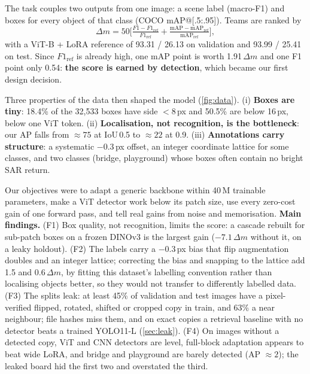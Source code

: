 \documentclass[10pt,twocolumn,letterpaper]{article}
\newcommand{\dm}{\ensuremath{\Delta m}}
\begin{document}
The task couples two outputs from one image: a scene label (macro-F1) and boxes for every object of that class (COCO mAP@[.5:.95]). Teams are ranked by
\begin{equation}
\dm = 50\Big[\tfrac{F1-F1_\text{ref}}{F1_\text{ref}} + \tfrac{\text{mAP}-\text{mAP}_\text{ref}}{\text{mAP}_\text{ref}}\Big],
\end{equation}
with a ViT-B + LoRA reference of 93.31 / 26.13 on validation and 93.99 / 25.41 on test. Since $F1_\text{ref}$ is already high, one mAP point is worth 1.91\,\dm{} and one F1 point only 0.54: \textbf{the score is earned by detection}, which became our first design decision.

Three properties of the data then shaped the model (\cref{fig:data}). (i) \textbf{Boxes are tiny}: 18.4\% of the 32{,}533 boxes have side $<8$\,px and 50.5\% are below 16\,px, \ie below one ViT token. (ii) \textbf{Localisation, not recognition, is the bottleneck}: our AP falls from ${\approx}75$ at IoU\,0.5 to ${\approx}22$ at 0.9. (iii) \textbf{Annotations carry structure}: a systematic $-0.3$\,px offset, an integer coordinate lattice for some classes, and two classes (bridge, playground) whose boxes often contain no bright SAR return.

Our objectives were to adapt a generic backbone within 40\,M trainable parameters, make a ViT detector work below its patch size, use every zero-cost gain of one forward pass, and tell real gains from noise and memorisation. \textbf{Main findings.} (F1) Box quality, not recognition, limits the score: a cascade rebuilt for sub-patch boxes on a frozen DINOv3 is the largest gain ($-7.1$\,\dm{} without it, on a leaky holdout). (F2) The labels carry a $-0.3$\,px bias that flip augmentation doubles and an integer lattice; correcting the bias and snapping to the lattice add 1.5 and 0.6\,\dm, by fitting this dataset's labelling convention rather than localising objects better, so they would not transfer to differently labelled data. (F3) The splits leak: at least 45\% of validation and test images have a pixel-verified flipped, rotated, shifted or cropped copy in train, and 63\% a near neighbour; file hashes miss them, and on exact copies a retrieval baseline with no detector beats a trained YOLO11-L (\cref{sec:leak}). (F4) On images without a detected copy, ViT and CNN detectors are level, full-block adaptation appears to beat wide LoRA, and bridge and playground are barely detected (AP ${\approx}2$); the leaked board hid the first two and overstated the third.
\end{document}
